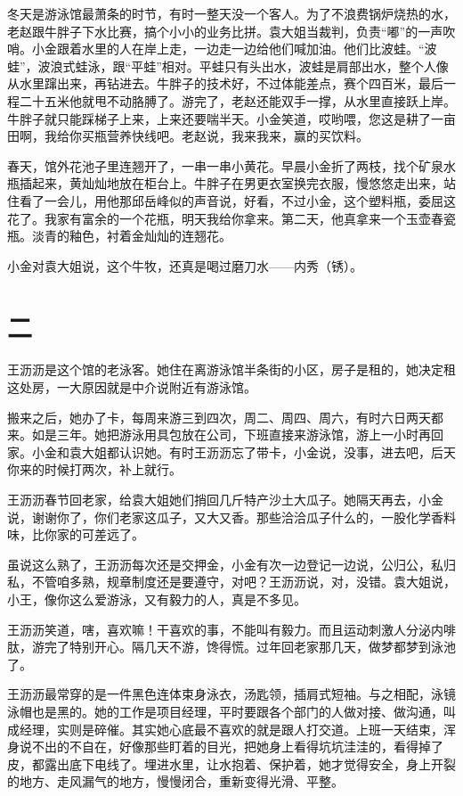 \documentclass[lang=cn,newtx,12pt,scheme=chinese]{elegantbook}
\begin{document}
冬天是游泳馆最萧条的时节，有时一整天没一个客人。为了不浪费锅炉烧热的水，老赵跟牛胖子下水比赛，搞个小小的业务比拼。袁大姐当裁判，负责“嘟”的一声吹哨。小金跟着水里的人在岸上走，一边走一边给他们喊加油。他们比波蛙。“波蛙”，波浪式蛙泳，跟“平蛙”相对。平蛙只有头出水，波蛙是肩部出水，整个人像从水里蹿出来，再钻进去。牛胖子的技术好，不过体能差点，赛个四百米，最后一程二十五米他就甩不动胳膊了。游完了，老赵还能双手一撑，从水里直接跃上岸。牛胖子就只能踩梯子上来，上来还要喘半天。小金笑道，哎哟喂，您这是耕了一亩田啊，我给你买瓶营养快线吧。老赵说，我来我来，赢的买饮料。

春天，馆外花池子里连翘开了，一串一串小黄花。早晨小金折了两枝，找个矿泉水瓶插起来，黄灿灿地放在柜台上。牛胖子在男更衣室换完衣服，慢悠悠走出来，站住看了一会儿，用他那邱岳峰似的声音说，好看，不过小金，这个塑料瓶，委屈这花了。我家有富余的一个花瓶，明天我给你拿来。第二天，他真拿来一个玉壶春瓷瓶。淡青的釉色，衬着金灿灿的连翘花。

小金对袁大姐说，这个牛牧，还真是喝过磨刀水——内秀（锈）。
\section{二}
王沥沥是这个馆的老泳客。她住在离游泳馆半条街的小区，房子是租的，她决定租这处房，一大原因就是中介说附近有游泳馆。

搬来之后，她办了卡，每周来游三到四次，周二、周四、周六，有时六日两天都来。如是三年。她把游泳用具包放在公司，下班直接来游泳馆，游上一小时再回家。小金和袁大姐都认识她。有时王沥沥忘了带卡，小金说，没事，进去吧，后天你来的时候打两次，补上就行。

王沥沥春节回老家，给袁大姐她们捎回几斤特产沙土大瓜子。她隔天再去，小金说，谢谢你了，你们老家这瓜子，又大又香。那些洽洽瓜子什么的，一股化学香料味，比你家的可差远了。

虽说这么熟了，王沥沥每次还是交押金，小金有次一边登记一边说，公归公，私归私，不管咱多熟，规章制度还是要遵守，对吧？王沥沥说，对，没错。袁大姐说，小王，像你这么爱游泳，又有毅力的人，真是不多见。

王沥沥笑道，嗐，喜欢嘛！干喜欢的事，不能叫有毅力。而且运动刺激人分泌内啡肽，游完了特别开心。隔几天不游，馋得慌。过年回老家那几天，做梦都梦到泳池了。

王沥沥最常穿的是一件黑色连体束身泳衣，汤匙领，插肩式短袖。与之相配，泳镜泳帽也是黑的。她的工作是项目经理，平时要跟各个部门的人做对接、做沟通，叫成经理，实则是碎催。其实她心底最不喜欢的就是跟人打交道。上班一天结束，浑身说不出的不自在，好像那些盯着的目光，把她身上看得坑坑洼洼的，看得掉了皮，都露出底下电线了。埋进水里，让水抱着、保护着，她才觉得安全，身上开裂的地方、走风漏气的地方，慢慢闭合，重新变得光滑、平整。
\end{document}
